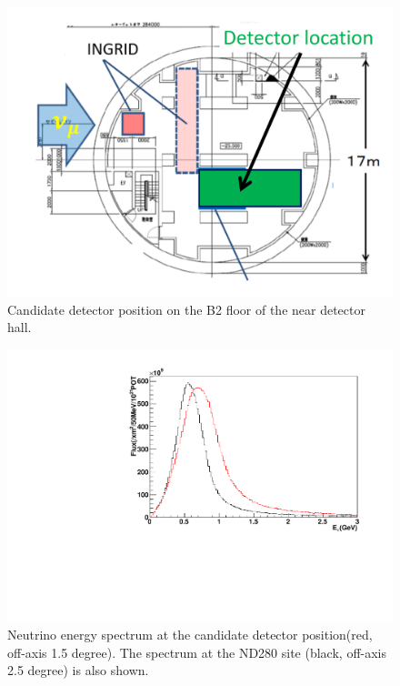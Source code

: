 \begin{figure}[tbhp]
\begin{center}
\includegraphics[width=0.7\linewidth]{fig/detector_position_b2.pdf}
\end{center}
\caption{
Candidate detector position on the B2 floor of the near detector hall.
}
\label{fig:location}
\end{figure}

\begin{figure}[tbhp]
\begin{center}
\includegraphics[width=0.4\linewidth, angle=270]{fig/b2_nd280_fluxes.pdf}
\end{center}
\caption{
Neutrino energy spectrum at the candidate detector position(red, off-axis 1.5 degree).
The spectrum at the ND280 site (black, off-axis 2.5 degree) is also shown.
}
\label{fig:b2flux}
\end{figure}

